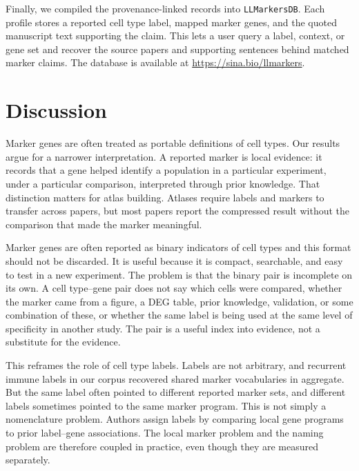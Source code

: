 \documentclass[10pt,twocolumn]{article}
\theoremstyle{plain}
\theoremstyle{definition}
\theoremstyle{remark}
\begin{document}
Finally, we compiled the provenance-linked records into \texttt{LLMarkersDB}.  Each profile stores a reported cell type label, mapped marker genes, and the quoted manuscript text supporting the claim.  This lets a user query a label, context, or gene set and recover the source papers and supporting sentences behind matched marker claims. The database is available at \href{https://sina.bio/llmarkers}{https://sina.bio/llmarkers}.

\section{Discussion}

Marker genes are often treated as portable definitions of cell types. Our results argue for a narrower interpretation. A reported marker is local evidence: it records that a gene helped identify a population in a particular experiment, under a particular comparison, interpreted through prior knowledge. That distinction matters for atlas building. Atlases require labels and markers to transfer across papers, but most papers report the compressed result without the comparison that made the marker meaningful.

Marker genes are often reported as binary indicators of cell types and this format should not be discarded. It is useful because it is compact, searchable, and easy to test in a new experiment. The problem is that the binary pair is incomplete on its own. A cell type--gene pair does not say which cells were compared, whether the marker came from a figure, a DEG table, prior knowledge, validation, or some combination of these, or whether the same label is being used at the same level of specificity in another study. The pair is a useful index into evidence, not a substitute for the evidence.

This reframes the role of cell type labels. Labels are not arbitrary, and recurrent immune labels in our corpus recovered shared marker vocabularies in aggregate. But the same label often pointed to different reported marker sets, and different labels sometimes pointed to the same marker program. This is not simply a nomenclature problem. Authors assign labels by comparing local gene programs to prior label--gene associations. The local marker problem and the naming problem are therefore coupled in practice, even though they are measured separately.
\end{document}
